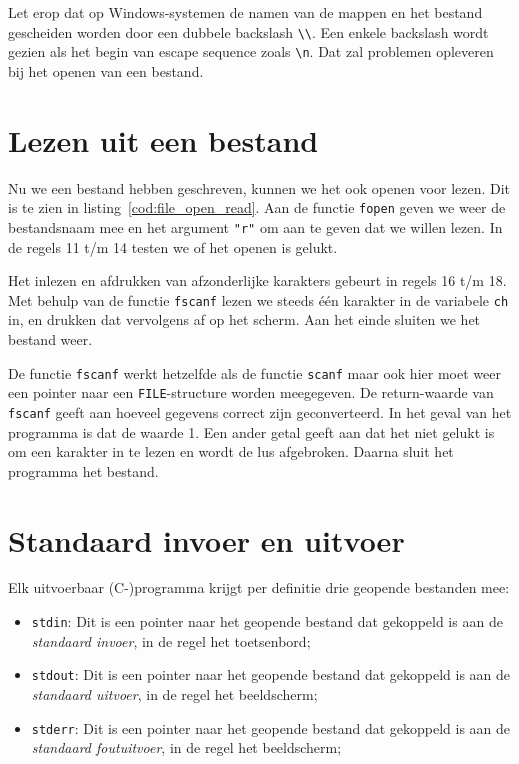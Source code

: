 Let erop dat op Windows-systemen de namen van de mappen en het bestand gescheiden worden door een dubbele backslash \texttt{\textbackslash\textbackslash}. Een enkele backslash wordt gezien als het begin van escape sequence zoals \texttt{\textbackslash n}. Dat zal problemen opleveren bij het openen van een bestand.

\section{Lezen uit een bestand}
Nu we een bestand hebben geschreven, kunnen we het ook openen voor lezen. Dit is te zien in listing~\ref{cod:file_open_read}. Aan de functie \texttt{fopen} geven we weer de bestandsnaam mee en het argument \texttt{"{}r"} om aan te geven dat we willen lezen. In de regels 11 t/m 14 testen we of het openen is gelukt.


Het inlezen en afdrukken van afzonderlijke karakters gebeurt in regels 16 t/m 18. Met behulp van de functie \texttt{fscanf} lezen we steeds één karakter in de variabele \texttt{ch} in, en drukken dat vervolgens af op het scherm. Aan het einde sluiten we het bestand weer.

De functie \texttt{fscanf} werkt hetzelfde als de functie \texttt{scanf} maar ook hier moet weer een pointer naar een \texttt{FILE}-structure worden meegegeven. De return-waarde van \texttt{fscanf} geeft aan hoeveel gegevens correct zijn geconverteerd. In het geval van het programma is dat de waarde 1. Een ander getal geeft aan dat het niet gelukt is om een karakter in te lezen en wordt de lus afgebroken. Daarna sluit het programma het bestand.


\section{Standaard invoer en uitvoer}
Elk uitvoerbaar (C-)programma krijgt per definitie drie geopende bestanden mee:

\begin{itemize}
\item \texttt{stdin}: Dit is een pointer naar het geopende bestand dat gekoppeld is aan de \textsl{standaard invoer}, in de regel het toetsenbord;
\item \texttt{stdout}: Dit is een pointer naar het geopende bestand dat gekoppeld is aan de \textsl{standaard uitvoer}, in de regel het beeldscherm;
\item \texttt{stderr}: Dit is een pointer naar het geopende bestand dat gekoppeld is aan de \textsl{standaard foutuitvoer}, in de regel het beeldscherm;
\end{itemize}

